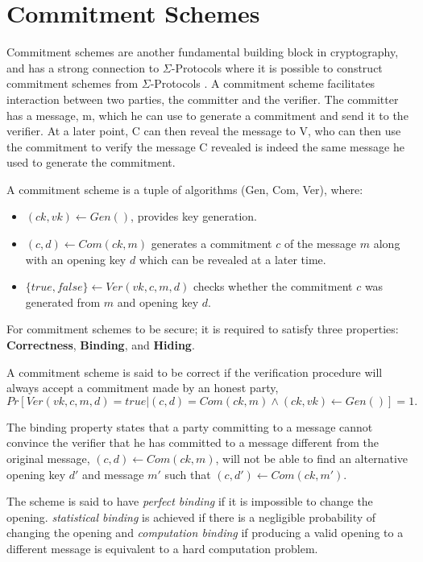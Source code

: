 \section{Commitment Schemes}
\label{sec:background:commitment}
Commitment schemes are another fundamental building block in cryptography, and
has a strong connection to $\Sigma$-Protocols where it is possible to construct
commitment schemes from $\Sigma$-Protocols \cite{cryptoeprint:2019:1185}.
A commitment scheme facilitates interaction between two parties, the committer
and the verifier.
The committer has a message, m, which he can use to generate a commitment and
send it to the verifier.
At a later point, C can then reveal the message
to V, who can then use the commitment to verify the message C revealed is indeed
the same message he used to generate the commitment.

\begin{definition}
A commitment scheme is a tuple of algorithms (Gen, Com, Ver), where:
\begin{itemize}
  \item $(ck, vk) \leftarrow Gen()$, provides key generation.
  \item $(c, d) \leftarrow Com(ck, m)$ generates a commitment $c$ of the message
    $m$ along with an opening key $d$ which can be revealed at a later time.
  \item $\{true, false\} \leftarrow Ver(vk, c, m, d)$ checks whether the
    commitment $c$ was generated from $m$ and opening key $d$.
\end{itemize}
\end{definition}

For commitment schemes to be secure; it is required to satisfy three
properties: \textbf{Correctness}, \textbf{Binding}, and \textbf{Hiding}.

\begin{definition}[correctness]
  A commitment scheme is said to be correct if
  the verification procedure  will always accept a commitment made by an honest party,
 \ie
$$
Pr[Ver(vk, c, m, d) = true | (c, d) = Com(ck, m) \land (ck, vk) \leftarrow Gen()] = 1.
$$
\end{definition}

\begin{definition}[binding]
The binding property states that a party committing to a message cannot
convince the verifier that he has committed to a message different from the
original message, \ie $(c, d) \leftarrow Com(ck, m)$, will
not be able to find an alternative opening key $d'$ and message $m'$ such that
$(c, d') \leftarrow Com(ck, m')$.

The scheme is said to have \textit{perfect binding} if it is impossible to change the
opening.
\textit{statistical binding} is achieved if there is a negligible probability of changing
the opening and \textit{computation binding} if producing a valid opening to a
different message is equivalent to a hard computation problem.
\end{definition}

